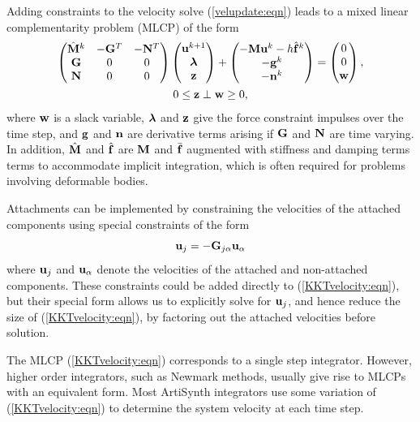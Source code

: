 Adding constraints to the velocity solve (\ref{velupdate:eqn})
leads to a mixed linear complementarity problem (MLCP)
of the form
\begin{gather}
\left(
\begin{matrix}
\hat{{\bf M}}^{k} & -{\bf G}^{T} & -{\bf N}^{T} \\
{\bf G} & 0 & 0 \\
{\bf N} & 0 & 0 
\end{matrix}
\right)
\left(
\begin{matrix}
{\bf u}^{k+1} \\
\boldsymbol\lambda \\
{\bf z}
\end{matrix}
\right)
+
\left(
\begin{matrix}
-{\bf M} {\bf u}^{k} - h \hat{{\bf f}}^{k} \\
-{\bf g}^k \\
-{\bf n}^k
\end{matrix}
\right)
=
\left(
\begin{matrix}
0 \\
0 \\
{\bf w}
\end{matrix}
\right), \notag \\
0 \le {\bf z} \perp {\bf w} \ge 0,
\label{KKTvelocity:eqn}
\end{gather}
where ${\bf w}$ is a slack variable, $\boldsymbol\lambda$ and ${\bf z}$ give the force
constraint impulses over the time step, and ${\bf g}$ and ${\bf n}$ are derivative
terms arising if ${\bf G}$ and ${\bf N}$ are time varying.  In addition,
$\hat{{\bf M}}$ and $\hat{{\bf f}}$ are ${\bf M}$ and $\bar{{\bf f}}$ augmented with stiffness
and damping terms terms to accommodate implicit integration, which
is often required for problems involving deformable bodies.

Attachments can be implemented by constraining the velocities of
the attached components using special constraints of the form
%
\begin{equation}
{\bf u}_j = -{\bf G}_{j\alpha} {\bf u}_\alpha
\label{attachments:eqn}
\end{equation}
%
where ${\bf u}_j$ and ${\bf u}_\alpha$ denote the velocities of the attached and
non-attached components. These constraints could be added directly to
(\ref{KKTvelocity:eqn}), but their special form allows us to
explicitly solve for ${\bf u}_j$, and hence reduce the size of
(\ref{KKTvelocity:eqn}), by factoring out the attached velocities
before solution.

The MLCP (\ref{KKTvelocity:eqn}) corresponds to a single step
integrator. However, higher order integrators, such as Newmark
methods, usually give rise to MLCPs with an equivalent form.  Most
ArtiSynth integrators use some variation of (\ref{KKTvelocity:eqn}) to
determine the system velocity at each time step.

